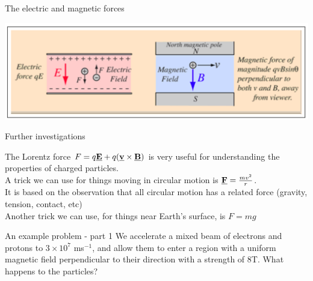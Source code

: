 \begin{frame}{The electric and magnetic forces}
\small

\includegraphics[scale=0.4]{lorentz}
\vspace{5cm}
\end{frame}



\begin{frame}{Further investigations}
\small

The Lorentz force $F = q\underline{\mathbf{E}} +q (\underline{\mathbf{v}} \times \underline{\mathbf{B}})$ is very useful for understanding the properties of charged particles.\\[2ex]
A trick we can use for things moving in circular motion is $\underline{\mathbf{F}} = \frac{mv^2}{r}$. \\[2ex]
It is based on the observation that all circular motion has a related force (gravity, tension, contact, etc)\\[2ex]
\vspace{3cm}
Another trick we can use, for things near Earth's surface, is $F = mg$\\[1ex]
\end{frame}

\begin{frame}{An example problem - part 1}
\small
We accelerate a mixed beam of electrons and protons to $3 \times 10^7$ ms$^{-1}$, and allow them to enter a region with a uniform magnetic field perpendicular to their direction with a strength of 8T. What happens to the particles?\\[21ex]

%
%
%
\end{frame}

